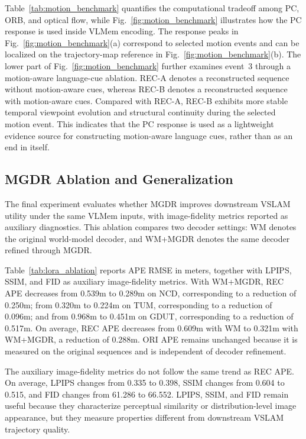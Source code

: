 \documentclass[journal]{IEEEtran}
\begin{document}
Table~\ref{tab:motion_benchmark} quantifies the computational tradeoff among PC, ORB, and optical flow, while Fig.~\ref{fig:motion_benchmark} illustrates how the PC response is used inside VLMem encoding. The response peaks in Fig.~\ref{fig:motion_benchmark}(a) correspond to selected motion events and can be localized on the trajectory-map reference in Fig.~\ref{fig:motion_benchmark}(b). The lower part of Fig.~\ref{fig:motion_benchmark} further examines event~3 through a motion-aware language-cue ablation. REC-A denotes a reconstructed sequence without motion-aware cues, whereas REC-B denotes a reconstructed sequence with motion-aware cues. Compared with REC-A, REC-B exhibits more stable temporal viewpoint evolution and structural continuity during the selected motion event. This indicates that the PC response is used as a lightweight evidence source for constructing motion-aware language cues, rather than as an end in itself.

\subsection{MGDR Ablation and Generalization}
\label{subsec:lora_ablation}

The final experiment evaluates whether MGDR improves downstream VSLAM utility under the same VLMem inputs, with image-fidelity metrics reported as auxiliary diagnostics. This ablation compares two decoder settings: WM denotes the original world-model decoder, and WM+MGDR denotes the same decoder refined through MGDR.



Table~\ref{tab:lora_ablation} reports APE RMSE in meters, together with LPIPS, SSIM, and FID as auxiliary image-fidelity metrics. With WM+MGDR, REC APE decreases from 0.539m to 0.289m on NCD, corresponding to a reduction of 0.250m; from 0.320m to 0.224m on TUM, corresponding to a reduction of 0.096m; and from 0.968m to 0.451m on GDUT, corresponding to a reduction of 0.517m. On average, REC APE decreases from 0.609m with WM to 0.321m with WM+MGDR, a reduction of 0.288m. ORI APE remains unchanged because it is measured on the original sequences and is independent of decoder refinement.

The auxiliary image-fidelity metrics do not follow the same trend as REC APE. On average, LPIPS changes from 0.335 to 0.398, SSIM changes from 0.604 to 0.515, and FID changes from 61.286 to 66.552. LPIPS, SSIM, and FID remain useful because they characterize perceptual similarity or distribution-level image appearance, but they measure properties different from downstream VSLAM trajectory quality.
\end{document}
